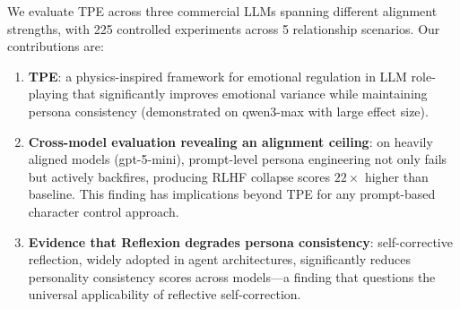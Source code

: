 We evaluate TPE across three commercial LLMs spanning different alignment strengths, with 225 controlled experiments across 5 relationship scenarios. Our contributions are:

\begin{enumerate}
    \item \textbf{TPE}: a physics-inspired framework for emotional regulation in LLM role-playing that significantly improves emotional variance while maintaining persona consistency (demonstrated on qwen3-max with large effect size).

    \item \textbf{Cross-model evaluation revealing an alignment ceiling}: on heavily aligned models (gpt-5-mini), prompt-level persona engineering not only fails but actively backfires, producing RLHF collapse scores $22\times$ higher than baseline. This finding has implications beyond TPE for any prompt-based character control approach.

    \item \textbf{Evidence that Reflexion degrades persona consistency}: self-corrective reflection, widely adopted in agent architectures, significantly reduces personality consistency scores across models---a finding that questions the universal applicability of reflective self-correction.
\end{enumerate}
